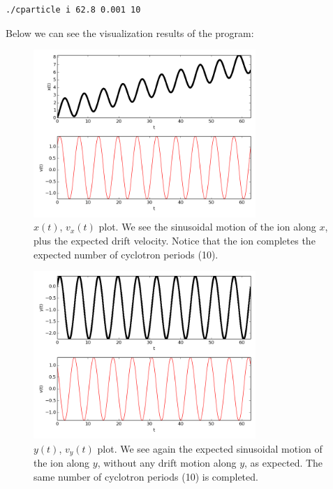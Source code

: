 \documentclass[11pt]{report}
\begin{document}
\begin{lstlisting}
./cparticle i 62.8 0.001 10
\end{lstlisting}

Below we can see the visualization results of the program:

\begin{figure}[!ht]
  \centering
    \includegraphics[width=0.75\textwidth]{images/drift_ion_x}
    \caption{$x(t)$, $v_x(t)$ plot. We see the sinusoidal motion of the ion along $x$, plus the expected drift velocity. Notice that the ion completes the expected number of cyclotron periods (10).}
\end{figure}

\begin{figure}[!ht]
  \centering
    \includegraphics[width=0.75\textwidth]{images/drift_ion_y}
     \caption{$y(t)$, $v_y(t)$ plot. We see again the expected sinusoidal motion of the ion along $y$, without any drift motion along $y$, as expected. The same number of cyclotron periods (10) is completed.}
\end{figure}
\end{document}
